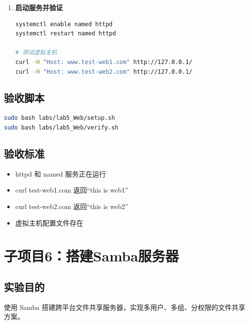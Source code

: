 \documentclass[12pt,a4paper]{ctexart}
\begin{document}
\begin{enumerate}[label=\arabic*.,leftmargin=*]
  \item \textbf{启动服务并验证}

  \begin{cmdbox}
  \begin{lstlisting}[language=bash]
systemctl enable named httpd
systemctl restart named httpd

# 测试虚拟主机
curl -H "Host: www.test-web1.com" http://127.0.0.1/
curl -H "Host: www.test-web2.com" http://127.0.0.1/
  \end{lstlisting}
  \end{cmdbox}

\end{enumerate}

\subsection{验收脚本}

\begin{cmdbox}
\begin{lstlisting}[language=bash]
sudo bash labs/lab5_Web/setup.sh
sudo bash labs/lab5_Web/verify.sh
\end{lstlisting}
\end{cmdbox}

\subsection{验收标准}

\begin{itemize}
  \item httpd 和 named 服务正在运行
  \item curl test-web1.com 返回``this is web1''
  \item curl test-web2.com 返回``this is web2''
  \item 虚拟主机配置文件存在
\end{itemize}

\newpage
\section{子项目6：搭建Samba服务器}

\subsection{实验目的}

使用 Samba 搭建跨平台文件共享服务器，实现多用户、多组、分权限的文件共享方案。
\end{document}
